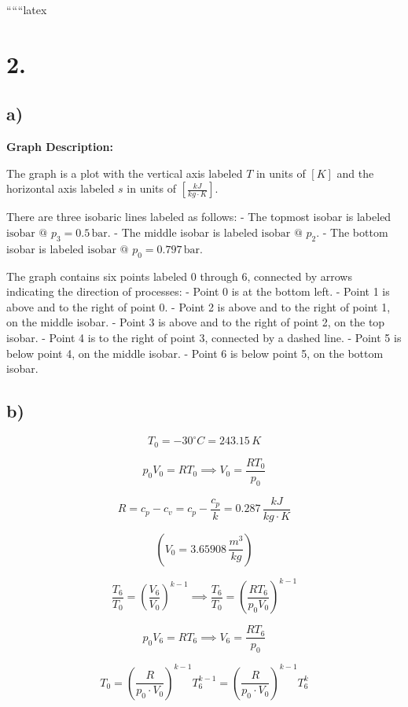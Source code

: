 
``````latex


\section*{2.}
\subsection*{a)}

\begin{center}
\textbf{Graph Description:}
\end{center}

The graph is a plot with the vertical axis labeled \( T \) in units of \( [K] \) and the horizontal axis labeled \( s \) in units of \( \left[ \frac{kJ}{kg \cdot K} \right] \). 

There are three isobaric lines labeled as follows:
- The topmost isobar is labeled \( \text{isobar @ } p_3 = 0.5 \, \text{bar} \).
- The middle isobar is labeled \( \text{isobar @ } p_2 \).
- The bottom isobar is labeled \( \text{isobar @ } p_0 = 0.797 \, \text{bar} \).

The graph contains six points labeled 0 through 6, connected by arrows indicating the direction of processes:
- Point 0 is at the bottom left.
- Point 1 is above and to the right of point 0.
- Point 2 is above and to the right of point 1, on the middle isobar.
- Point 3 is above and to the right of point 2, on the top isobar.
- Point 4 is to the right of point 3, connected by a dashed line.
- Point 5 is below point 4, on the middle isobar.
- Point 6 is below point 5, on the bottom isobar.

\subsection*{b)}

\[
T_0 = -30^\circ C = 243.15 \, K
\]

\[
p_0 V_0 = R T_0 \implies V_0 = \frac{R T_0}{p_0}
\]

\[
R = c_p - c_v = c_p - \frac{c_p}{k} = 0.287 \, \frac{kJ}{kg \cdot K}
\]

\[
\left( V_0 = 3.65908 \, \frac{m^3}{kg} \right)
\]

\[
\frac{T_6}{T_0} = \left( \frac{V_6}{V_0} \right)^{k-1} \implies \frac{T_6}{T_0} = \left( \frac{R T_6}{p_0 V_0} \right)^{k-1}
\]

\[
p_0 V_6 = R T_6 \implies V_6 = \frac{R T_6}{p_0}
\]

\[
T_0 = \left( \frac{R}{p_0 \cdot V_0} \right)^{k-1} T_6^{k-1} = \left( \frac{R}{p_0 \cdot V_0} \right)^{k-1} T_6^{k}
\]

